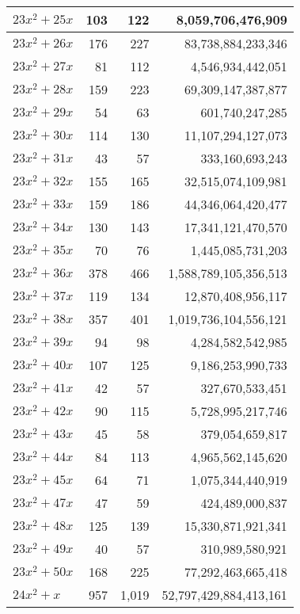 \documentclass[a4paper]{amsproc}
\theoremstyle{plain}
\theoremstyle{named}
\begin{document}
\begin{longtable}{ | l | r | r | r | }
$23x^2 + 25x$ & 103 & 122 & 8{,}059{,}706{,}476{,}909 \\ \hline
$23x^2 + 26x$ & 176 & 227 & 83{,}738{,}884{,}233{,}346 \\ \hline
$23x^2 + 27x$ & 81 & 112 & 4{,}546{,}934{,}442{,}051 \\ \hline
$23x^2 + 28x$ & 159 & 223 & 69{,}309{,}147{,}387{,}877 \\ \hline
$23x^2 + 29x$ & 54 & 63 & 601{,}740{,}247{,}285 \\ \hline
$23x^2 + 30x$ & 114 & 130 & 11{,}107{,}294{,}127{,}073 \\ \hline
$23x^2 + 31x$ & 43 & 57 & 333{,}160{,}693{,}243 \\ \hline
$23x^2 + 32x$ & 155 & 165 & 32{,}515{,}074{,}109{,}981 \\ \hline
$23x^2 + 33x$ & 159 & 186 & 44{,}346{,}064{,}420{,}477 \\ \hline
$23x^2 + 34x$ & 130 & 143 & 17{,}341{,}121{,}470{,}570 \\ \hline
$23x^2 + 35x$ & 70 & 76 & 1{,}445{,}085{,}731{,}203 \\ \hline
$23x^2 + 36x$ & 378 & 466 & 1{,}588{,}789{,}105{,}356{,}513 \\ \hline
$23x^2 + 37x$ & 119 & 134 & 12{,}870{,}408{,}956{,}117 \\ \hline
$23x^2 + 38x$ & 357 & 401 & 1{,}019{,}736{,}104{,}556{,}121 \\ \hline
$23x^2 + 39x$ & 94 & 98 & 4{,}284{,}582{,}542{,}985 \\ \hline
$23x^2 + 40x$ & 107 & 125 & 9{,}186{,}253{,}990{,}733 \\ \hline
$23x^2 + 41x$ & 42 & 57 & 327{,}670{,}533{,}451 \\ \hline
$23x^2 + 42x$ & 90 & 115 & 5{,}728{,}995{,}217{,}746 \\ \hline
$23x^2 + 43x$ & 45 & 58 & 379{,}054{,}659{,}817 \\ \hline
$23x^2 + 44x$ & 84 & 113 & 4{,}965{,}562{,}145{,}620 \\ \hline
$23x^2 + 45x$ & 64 & 71 & 1{,}075{,}344{,}440{,}919 \\ \hline
$23x^2 + 47x$ & 47 & 59 & 424{,}489{,}000{,}837 \\ \hline
$23x^2 + 48x$ & 125 & 139 & 15{,}330{,}871{,}921{,}341 \\ \hline
$23x^2 + 49x$ & 40 & 57 & 310{,}989{,}580{,}921 \\ \hline
$23x^2 + 50x$ & 168 & 225 & 77{,}292{,}463{,}665{,}418 \\ \hline
$24x^2 + x$ & 957 & 1{,}019 & 52{,}797{,}429{,}884{,}413{,}161 \\ \hline

\end{longtable}
\end{document}
